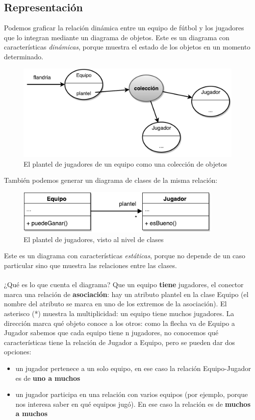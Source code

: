 \documentclass[a4paper,12pt]{book}
\begin{document}
\subsection{Representación}
Podemos graficar la relación dinámica entre un equipo de fútbol y los jugadores que lo integran mediante un diagrama
de objetos. Este es un diagrama con características \textit{dinámicas}, porque muestra el estado 
de los objetos en un momento determinado.
\\
\begin{figure}[h!]
    \centering
    \includegraphics[width=1.1\textwidth]{images/02_Equipo_Coleccion.pdf}
    \caption{El plantel de jugadores de un equipo como una colección de objetos}
\end{figure}
\FloatBarrier
También podemos generar un diagrama de clases de la misma relación:
\begin{figure}[h!]
    \centering	
    \includegraphics[width=0.9\textwidth]{images/03_Diagrama_Clases_Equipo.pdf}
    \caption{El plantel de jugadores, visto al nivel de clases}
\end{figure}
\FloatBarrier
Este es un diagrama con características \textit{estáticas}, porque no depende de un caso particular
sino que muestra las relaciones entre las clases.\\
\\
¿Qué es lo que cuenta el diagrama? Que un equipo \textbf{tiene} jugadores, el conector marca una relación
de \textbf{asociación}: hay un atributo plantel en la clase Equipo (el nombre del atributo se marca en uno
de los extremos de la asociación). El asterisco (*) muestra la multiplicidad: un equipo tiene muchos jugadores.
La dirección marca qué objeto conoce a los otros: como la flecha va de Equipo a Jugador sabemos que cada equipo
tiene n jugadores, no conocemos qué características tiene la relación de Jugador a Equipo, pero se pueden dar
dos opciones:
\begin{itemize}
\item un jugador pertenece a un solo equipo, en ese caso la relación Equipo-Jugador es de \textbf{uno a muchos}
\item un jugador participa en una relación con varios equipos (por ejemplo, porque nos interesa saber
en qué equipos jugó). En ese caso la relación es de \textbf{muchos a muchos}
\end{itemize}
\end{document}
